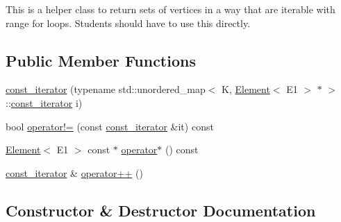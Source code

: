 This is a helper class to return sets of vertices in a way that are iterable with range for loops. Students should have to use this directly. \subsection*{Public Member Functions}
\begin{DoxyCompactItemize}
\item 
\mbox{\hyperlink{classbridges_1_1datastructure_1_1_graph_adj_list_1_1_vertex_element_set__listhelper_1_1const__iterator_a023fa89f9e79573104de174f5fbab487}{const\+\_\+iterator}} (typename std\+::unordered\+\_\+map$<$ K, \mbox{\hyperlink{classbridges_1_1datastructure_1_1_element}{Element}}$<$ E1 $>$ $\ast$ $>$\+::\mbox{\hyperlink{classbridges_1_1datastructure_1_1_graph_adj_list_1_1_vertex_element_set__listhelper_1_1const__iterator}{const\+\_\+iterator}} i)
\item 
bool \mbox{\hyperlink{classbridges_1_1datastructure_1_1_graph_adj_list_1_1_vertex_element_set__listhelper_1_1const__iterator_ac7ce05d2bf7491005acf6e4a668cea1b}{operator!=}} (const \mbox{\hyperlink{classbridges_1_1datastructure_1_1_graph_adj_list_1_1_vertex_element_set__listhelper_1_1const__iterator}{const\+\_\+iterator}} \&it) const
\item 
\mbox{\hyperlink{classbridges_1_1datastructure_1_1_element}{Element}}$<$ E1 $>$ const  $\ast$ \mbox{\hyperlink{classbridges_1_1datastructure_1_1_graph_adj_list_1_1_vertex_element_set__listhelper_1_1const__iterator_a5ac98142924a93dbbc3363c50698e793}{operator$\ast$}} () const
\item 
\mbox{\hyperlink{classbridges_1_1datastructure_1_1_graph_adj_list_1_1_vertex_element_set__listhelper_1_1const__iterator}{const\+\_\+iterator}} \& \mbox{\hyperlink{classbridges_1_1datastructure_1_1_graph_adj_list_1_1_vertex_element_set__listhelper_1_1const__iterator_ac1c6d4c3ab7486d648e469b1783f42df}{operator++}} ()
\end{DoxyCompactItemize}


\subsection{Constructor \& Destructor Documentation}
\mbox{\label{classbridges_1_1datastructure_1_1_graph_adj_list_1_1_vertex_element_set__listhelper_1_1const__iterator_a023fa89f9e79573104de174f5fbab487}} 
